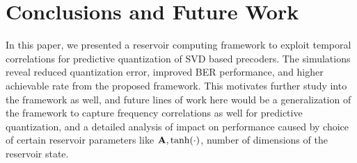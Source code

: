 \documentclass[conference]{IEEEtran}
\begin{document}
\section{Conclusions and Future Work}
\label{section5}
In this paper, we presented a reservoir computing framework to exploit temporal correlations for predictive quantization of SVD based precoders. The simulations reveal reduced quantization error, improved BER performance, and higher achievable rate from the proposed framework. This motivates further study into the framework as well, and future lines of work here would be a generalization of the framework to capture frequency correlations as well for predictive quantization, and a detailed analysis of impact on performance caused by choice of certain reservoir parameters like ${\bf A},\text{tanh}(\cdot)$, number of dimensions of the reservoir state.




\renewcommand{\bibfont}{\footnotesize}


\end{document}
